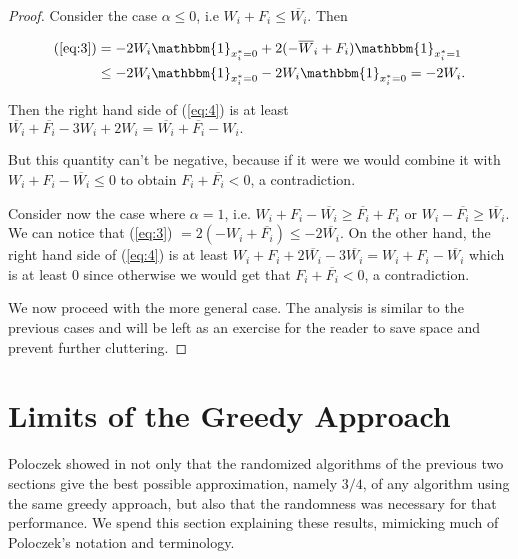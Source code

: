 \documentclass[11pt,letter]{article}
\numberwithin{theorem}{section}
\begin{document}
\begin{proof}
Consider the case $\alpha \leq 0$, i.e $W_i + F_i \leq \overline{W_i}$. Then 

\begin{equation*}
\begin{aligned}
(\ref{eq:3}) & = -2W_i \mathbbm{1}_{x_i^* = 0} + 2(-\overline{W}_i + F_i) \mathbbm{1}_{x_i^* = 1} \\ 
& \leq  -2W_i \mathbbm{1}_{x_i^* = 0} - 2W_i \mathbbm{1}_{x_i^* = 0} = -2W_i.
\end{aligned}
\end{equation*} 

Then the right hand side of (\ref{eq:4}) is at least $\overline{W_i} + \overline{F_i} - 3W_i + 2W_i =
\overline{W_i} + \overline{F_i} - W_i.$ 

But this quantity can't be negative, because if it were we would combine it with $W_i + F_i - \overline{W_i} \leq 0$ to obtain $F_i +
\overline{F_i} < 0$, a contradiction.

Consider now the case where $\alpha = 1$, i.e. $W_i + F_i -\overline{W_i} \geq \overline{F_i} + F_i$ or $W_i - \overline{F_i} \geq \overline{W_i}$.
We can notice that (\ref{eq:3}) $= 2(-W_i + \overline{F_i}) \leq -2\overline{W_i}$. On the other hand, the right hand side of  (\ref{eq:4})
is at least $W_i + F_i + 2\overline{W_i} -3\overline{W_i} = W_i + F_i - \overline{W_i}$ which is at least $0$ since otherwise we would get
that $F_i + \overline{F_i} < 0$, a contradiction.

We now proceed with the more general case. The analysis is similar to the previous cases and will be left as an exercise
for the reader to save space and prevent further cluttering.

\end{proof}


\section{Limits of the Greedy Approach}\label{S:limits}

Poloczek showed in \cite{DBLP:conf/esa/Poloczek11} not only that
the randomized algorithms of the previous two sections
give the best possible approximation, namely $3/4$,
of any algorithm using the same greedy approach,
but also that the randomness was necessary for that performance.
We spend this section explaining these results,
mimicking much of Poloczek's notation and terminology.
\end{document}
